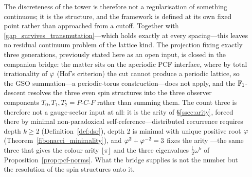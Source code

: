 \begin{remark}
The discreteness of the tower is therefore not a regularisation of something continuous; it is the
structure, and the framework is defined at its own fixed point rather than approached from a
cutoff. Together with \eqref{gap_survives_transmutation}---which holds exactly at every spacing---this leaves
no residual continuum problem of the lattice kind. The projection fixing exactly three generations, previously stated
here as an open input, is closed in the companion bridge: the matter sits on the aperiodic PCF
interface, where by total irrationality of $\varphi$ (Hof's criterion) the cut cannot produce a
periodic lattice, so the GSO summation---a periodic-torus construction---does not apply, and the
$\mathbb{F}_1$-descent resolves the three even spin structures into the three observer components
$T_0,T_1,T_2=P\text{-}C\text{-}F$ rather than summing them. The count three is therefore not a
gauge-sector input at all: it is the arity of \S\ref{ssec:arity}, forced there by minimal
non-paradoxical self-reference---distributed recurrence requires depth $k\ge2$
(Definition~\ref{def:dsr}), depth $2$ is minimal with unique positive root $\varphi$
(Theorem~\ref{fibonacci_minimality}), and $\varphi^{2}+\varphi^{-2}=3$ fixes the arity
---the same three that gives the colour arity $\lfloor\pi\rfloor$ and the
three eigenvalues $\tfrac12\omega^{k}$ of Proposition~\ref{prop:pcf-norms}. What the bridge supplies
is not the number but the resolution of the spin structures onto it.


\end{remark}

